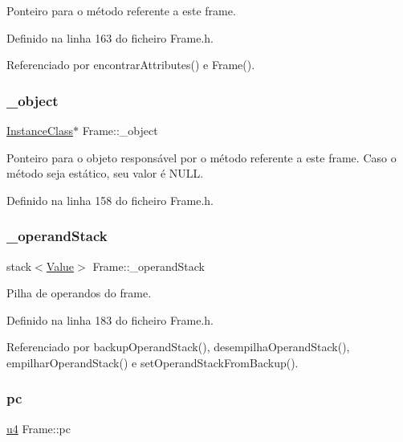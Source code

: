 Ponteiro para o método referente a este frame. 

Definido na linha 163 do ficheiro Frame.\+h.



Referenciado por encontrar\+Attributes() e Frame().

\mbox{\label{classFrame_a618b0873a50306f7805ea09685e8eee9}} 
\subsubsection{\texorpdfstring{\+\_\+object}{\_object}}
{\footnotesize\ttfamily \hyperlink{classInstanceClass}{Instance\+Class}$\ast$ Frame\+::\+\_\+object\hspace{0.3cm}{\ttfamily [private]}}

Ponteiro para o objeto responsável por o método referente a este frame. Caso o método seja estático, seu valor é {\ttfamily N\+U\+LL}. 

Definido na linha 158 do ficheiro Frame.\+h.

\mbox{\label{classFrame_abb8b7f1997e7f3da06d6b0f9aaf61ab2}} 
\subsubsection{\texorpdfstring{\+\_\+operand\+Stack}{\_operandStack}}
{\footnotesize\ttfamily stack$<$\hyperlink{structValue}{Value}$>$ Frame\+::\+\_\+operand\+Stack\hspace{0.3cm}{\ttfamily [private]}}

Pilha de operandos do frame. 

Definido na linha 183 do ficheiro Frame.\+h.



Referenciado por backup\+Operand\+Stack(), desempilha\+Operand\+Stack(), empilhar\+Operand\+Stack() e set\+Operand\+Stack\+From\+Backup().

\mbox{\label{classFrame_ada6a6cf76d00cbadf43a86a686dd026c}} 
\subsubsection{\texorpdfstring{pc}{pc}}
{\footnotesize\ttfamily \hyperlink{BasicTypes_8h_ae5be1f726785414dd1b77d60df074c9d}{u4} Frame\+::pc}

